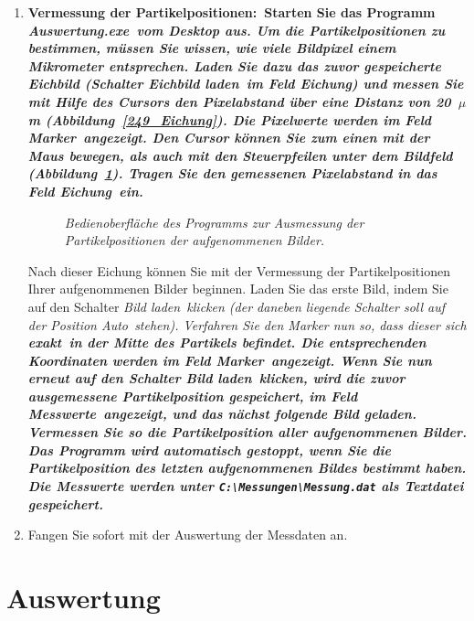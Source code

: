 \documentclass{../papanleitung}
\begin{document}
\begin{enumerate}
\item \bf Vermessung der Partikelpositionen:\rm~Starten Sie das
Programm \it Auswertung.exe\rm~vom Desktop aus. Um die
Partikelpositionen zu bestimmen, m\"{u}ssen Sie wissen, wie viele
Bildpixel einem Mikrometer entsprechen. Laden Sie dazu das zuvor
gespeicherte Eichbild (Schalter \it Eichbild laden\rm~im Feld \it
Eichung\rm) und messen Sie mit Hilfe des Cursors den Pixelabstand
\"{u}ber eine Distanz von 20~$\mu$m (Abbildung~\ref{249_Eichung}). Die
Pixelwerte werden im Feld \it Marker\rm~angezeigt. Den Cursor
k\"{o}nnen Sie zum einen mit der Maus bewegen, als auch mit den
Steuerpfeilen unter dem Bildfeld (Abbildung~\ref{249_Programm}).
Tragen Sie den gemessenen Pixelabstand in das Feld \it
Eichung\rm~ein.

\begin{figure}[h]
\begin{minipage}[c]{12cm}
\centering{}
\caption{\label{249_Programm}\fontsize{10}{12}\it Bedienoberfl\"{a}che
des Programms zur Ausmessung der Partikelpositionen der
aufgenommenen Bilder.}
\end{minipage}
\end{figure}

Nach dieser Eichung k\"{o}nnen Sie mit der Vermessung der
Partikelpositionen Ihrer aufgenommenen Bilder beginnen. Laden Sie
das erste Bild, indem Sie auf den Schalter \it Bild
laden\rm~klicken (der daneben liegende Schalter soll auf der
Position \it Auto\rm~stehen). Verfahren Sie den Marker nun so,
dass dieser sich \bf exakt\rm~in der Mitte des Partikels befindet.
Die entsprechenden Koordinaten werden im Feld \glqq
Marker\grqq~angezeigt. Wenn Sie nun erneut auf den Schalter \it
Bild laden\rm~klicken, wird die zuvor ausgemessene
Partikelposition gespeichert, im Feld \it Messwerte\rm~angezeigt,
und das n\"{a}chst folgende Bild geladen. Vermessen Sie so die
Partikelposition aller aufgenommenen Bilder. Das Programm wird
automatisch gestoppt, wenn Sie die Partikelposition des letzten
aufgenommenen Bildes bestimmt haben. Die Messwerte werden unter
\verb"C:\Messungen\Messung.dat" als Textdatei gespeichert.

\item Fangen Sie sofort mit der Auswertung der Messdaten an.
\end{enumerate}




\section{Auswertung}
\end{document}
